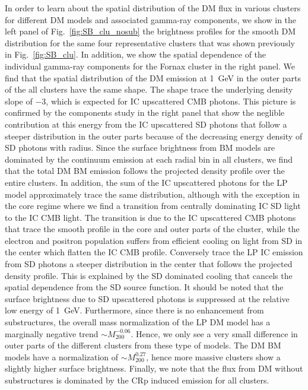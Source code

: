 \documentclass[10pt,aps,pra,reprint,amsmath,amsfonts,amssymb,showpacs,nofootinbib,floatfix]{revtex4-1}
\def\del#1{{}}
\newcommand{\mvir}{M_{200}}
\begin{document}
\del{NEED TO REWRITE, JUMPING BACK AND FORTH BETWEEN PANELS} In order
to learn about the spatial distribution of the DM flux in various
clusters for different DM models and associated gamma-ray components,
we show in the left panel of Fig.~\ref{fig:SB_clu_nosub} the
brightness profiles for the smooth DM distribution for the same four
representative clusters that was shown previously in
Fig.~\ref{fig:SB_clu}. In addition, we show the spatial dependence of
the individual gamma-ray components for the Fornax cluster in the
right panel. We find that the spatial distribution of the DM emission
at 1~GeV in the outer parts of the all clusters have the same
shape. The shape trace the underlying density slope of $-3$, which is
expected for IC upscattered CMB photons. This picture is confirmed by
the components study in the right panel that show the neglible
contribution at this energy from the IC upscattered SD photons that
follow a steeper distribution in the outer parts because of the
decreasing energy density of SD photons with radius. Since the surface
brightness from BM models are dominated by the continuum emission at
each radial bin in all clusters, we find that the total DM BM emission
follows the projected density profile over the entire clusters. In
addition, the sum of the IC upscattered photons for the LP model
approximately trace the same distribution, although with the exception
in the core regime where we find a transition from centrally
dominating IC SD light to the IC CMB light. The transition is due to
the IC upscattered CMB photons that trace the smooth profile in the
core and outer parts of the cluster, while the electron and positron
population suffers from efficient cooling on light from SD in the
center which flatten the IC CMB profile. Conversely trace the LP IC
emission from SD photons a steeper distribution in the center that
follows the projected density profile. This is explained by the SD
dominated cooling that cancels the spatial dependence from the SD
source function. \del{In the left panel we also find some variation in
  the profiles for the different clusters in the central
  parts. Especially in the Fornax cluster, where we find a factor two
  larger flux compared to the other clusters. This is due to more
  efficient SD cooling of the dominating IC upscattered CMB photons in
  Fornax; a low X-ray luminous cluster has a low energy density in
  starlight and dust in our analytic SD model.} It should be
noted that the surface brightness due to SD upscattered photons is
suppressed at the relative low energy of 1~GeV. Furthermore, since
there is no enhancement from substructures, the overall mass
normalization of the LP DM model has a marginally negative trend
$\sim\mvir^{-0.06}$. Hence, we only see a very small difference in
outer parts of the different clusters from these type of models. The
DM BM models have a normalization of $\sim\mvir^{0.27}$, hence more
massive clusters show a slightly higher surface brightness. Finally,
we note that the flux from DM without substructures is dominated by
the CRp induced emission for all clusters.
\end{document}
